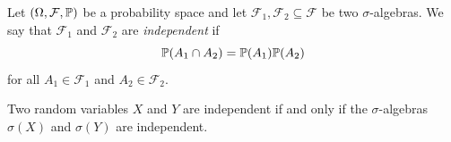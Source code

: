 \begin{definition}\label{def:independence-of-sigma-algebras}
Let $(\Omega, \mathcal{F}, \mathbb{P})$ be a probability space and let $\mathcal{F}_1, \mathcal{F}_2 \subseteq \mathcal{F}$ be two $\sigma$-algebras.
We say that $\mathcal{F}_1$ and $\mathcal{F}_2$ are \emph{independent} if 
\[
\mathbb{P}(A_1 \cap A_2) = \mathbb{P}(A_1) \mathbb{P}(A_2)
\]
for all $A_1 \in \mathcal{F}_1$ and $A_2 \in \mathcal{F}_2$.
\end{definition}

\begin{theorem}\label{thm:independence-of-random-variables-sigma-algebras}
Two random variables $X$ and $Y$ are independent if and only if the $\sigma$-algebras $\sigma(X)$ and $\sigma(Y)$ are independent.
\end{theorem}

